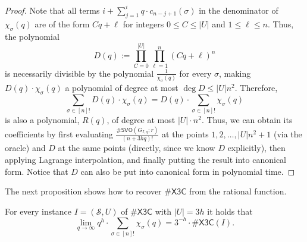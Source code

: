 \documentclass[11pt]{amsart}
\begin{document}
\begin{proof}




Note that all terms $i + \sum_{j=1}^i q \cdot c_{n-j+1}(\sigma)$ in the denominator of $\chi_{\sigma}(q)$ are of the form $Cq + \ell$ for integers $0 \leq C \leq |U|$ and $1 \leq \ell \leq n$. Thus, 
the polynomial 
\[
    D(q) := \prod_{C = 0}^{|U|} \prod_{\ell=1}^{n} (Cq + \ell)^n
\]
is necessarily divisible by the polynomial $\frac{1}{\chi_\sigma(q)}$ for every $\sigma$, making $D(q) \cdot \chi_\sigma(q)$ a polynomial of degree at most $\deg D \leq |U|n^2$. Therefore,
\[
    \sum_{\sigma \in [n]!} D(q)\cdot \chi_\sigma(q) = D(q) \cdot \sum_{\sigma \in [n]!} \chi_\sigma(q)
\] is also a polynomial, $R(q)$, of degree at most $|U| \cdot n^2$.  Thus, we can obtain its coefficients by first evaluating $\frac{\#\mathsf{SVO}(G_{I, q}; r)}{(n+3hq)!}$ at the points $1, 2, \ldots, |U|n^2 + 1$ (via the oracle) and $D$ at the same points (directly, since we know $D$ explicitly), then applying Lagrange interpolation, and finally putting the result into canonical form. Notice that $D$ can also be put into canonical form in polynomial time.
\end{proof}

The next proposition shows how to recover $\#\mathsf{X3C}$ from the rational function.

\begin{proposition}\label{prop:reduction}
    For every instance $I = (\mathcal{S}, U)$ of $\#\mathsf{X3C}$ with $|U| = 3h$ it holds that
    \[
        \lim_{q \to \infty} q^h \cdot \sum_{\sigma \in [n]!} \chi_{\sigma}(q) = 3^{-h} \cdot \#\mathsf{X3C}(I).
    \]
\end{proposition}
\end{document}
